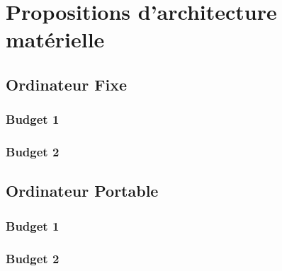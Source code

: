 \chapter{Propositions d'architecture matérielle}

\section{Ordinateur Fixe}

\subsection{Budget 1}
\subsection{Budget 2}

\section{Ordinateur Portable}

\subsection{Budget 1}
\subsection{Budget 2}